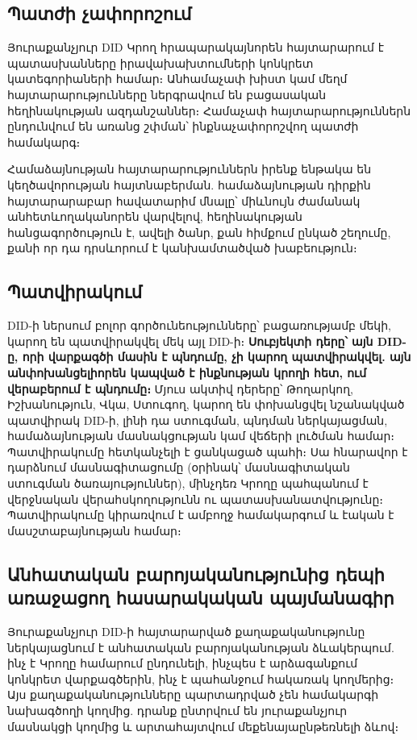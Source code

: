 \documentclass[11pt,a4paper,twocolumn]{article}
\begin{document}
\subsection{Պատժի չափորոշում}

Յուրաքանչյուր DID Կրող հրապարակայնորեն հայտարարում է պատասխանները իրավախախտումների կոնկրետ կատեգորիաների համար։ Անհամաչափ խիստ կամ մեղմ հայտարարությունները ներգրավում են բացասական հեղինակության ազդանշաններ։ Համաչափ հայտարարություններն ընդունվում են առանց շփման՝ ինքնաչափորոշվող պատժի համակարգ։

Համաձայնության հայտարարություններն իրենք ենթակա են կեղծավորության հայտնաբերման. համաձայնության դիրքին հայտարարաբար հավատարիմ մնալը՝ միևնույն ժամանակ անհետևողականորեն վարվելով, հեղինակության հանցագործություն է, ավելի ծանր, քան հիմքում ընկած շեղումը, քանի որ դա դրսևորում է կանխամտածված խաբեություն։

\subsection{Պատվիրակում}

DID-ի ներսում բոլոր գործունեությունները՝ բացառությամբ մեկի, կարող են պատվիրակվել մեկ այլ DID-ի։ \textbf{Սուբյեկտի դերը՝ այն DID-ը, որի վարքագծի մասին է պնդումը, չի կարող պատվիրակվել. այն անփոխանցելիորեն կապված է ինքնության կրողի հետ, ում վերաբերում է պնդումը։} Մյուս ակտիվ դերերը՝ Թողարկող, Իշխանություն, Վկա, Ստուգող, կարող են փոխանցվել նշանակված պատվիրակ DID-ի, լինի դա ստուգման, պնդման ներկայացման, համաձայնության մասնակցության կամ վեճերի լուծման համար։ Պատվիրակումը հետկանչելի է ցանկացած պահի։ Սա հնարավոր է դարձնում մասնագիտացումը (օրինակ՝ մասնագիտական ստուգման ծառայություններ), մինչդեռ Կրողը պահպանում է վերջնական վերահսկողությունն ու պատասխանատվությունը։ Պատվիրակումը կիրառվում է ամբողջ համակարգում և էական է մասշտաբայնության համար։

\subsection{Անհատական բարոյականությունից դեպի առաջացող հասարակական պայմանագիր}

Յուրաքանչյուր DID-ի հայտարարված քաղաքականությունը ներկայացնում է անհատական բարոյականության ձևակերպում. ինչ է Կրողը համարում ընդունելի, ինչպես է արձագանքում կոնկրետ վարքագծերին, ինչ է պահանջում հակառակ կողմերից։ Այս քաղաքականությունները պարտադրված չեն համակարգի նախագծողի կողմից. դրանք ընտրվում են յուրաքանչյուր մասնակցի կողմից և արտահայտվում մեքենայաընթեռնելի ձևով։
\end{document}
